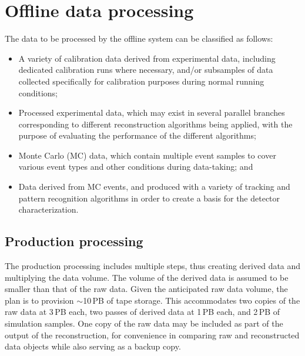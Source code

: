 \section{Offline data processing} %
\label{sec:protodune-offline}

The data to be processed by the offline system can be classified as follows:
\begin{itemize}

\item A variety of calibration data derived from experimental data, including dedicated calibration
runs where necessary, and/or subsamples of data collected specifically for calibration
purposes during normal running conditions;

\item Processed experimental data, which may exist in several parallel branches corresponding to
different reconstruction algorithms being applied, with the purpose of evaluating the performance
of the different algorithms;

\item Monte Carlo (MC) data, which contain multiple event samples to cover various event types
and other conditions during data-taking; and %

\item Data derived from MC events, and produced with a variety of tracking and pattern recognition algorithms
in order to create a basis for the detector characterization.

\end{itemize}

\subsection{Production processing}
\label{sec:prod-process}

The production processing includes multiple steps, %
thus creating derived data and multiplying the data volume.  The volume of the derived data is assumed to be smaller than that of the raw data.
Given the anticipated raw data volume, %
the %
plan is to provision $\sim$10\,PB of tape storage. %
This accommodates %
two copies of the raw data at 3\,PB each, two passes of derived data at 1\,PB each, and 2\,PB of simulation samples.
One copy 
of the raw data may be included as part of the output of the reconstruction, for convenience in comparing
raw and reconstructed data objects while also serving %
as a backup copy. %

